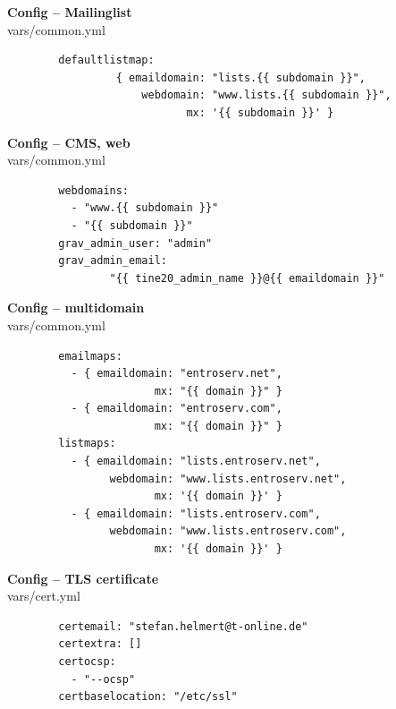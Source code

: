 \documentclass{beamer}
\begin{document}
\begin{frame}[fragile]{\insertsection}{\insertsubsection}
	\vspace{-0.5cm}
	\textbf{Config -- Mailinglist}\\
	vars/common.yml
	\begin{verbatim}
		defaultlistmap:
		         { emaildomain: "lists.{{ subdomain }}",
		             webdomain: "www.lists.{{ subdomain }}",
		                    mx: '{{ subdomain }}' }
	\end{verbatim}
\end{frame}	

\begin{frame}[fragile]{\insertsection}{\insertsubsection}
	\vspace{-0.5cm}
	\textbf{Config -- CMS, web}\\
	vars/common.yml
	\begin{verbatim}
		webdomains: 
		  - "www.{{ subdomain }}"
		  - "{{ subdomain }}"
		grav_admin_user: "admin"
		grav_admin_email:
		        "{{ tine20_admin_name }}@{{ emaildomain }}"
	\end{verbatim}
\end{frame}	

\begin{frame}[fragile]{\insertsection}{\insertsubsection}
	\vspace{-0.5cm}
	\textbf{Config -- multidomain}\\
	vars/common.yml
	\begin{verbatim}
		emailmaps:
		  - { emaildomain: "entroserv.net",
		               mx: "{{ domain }}" }
		  - { emaildomain: "entroserv.com",
		               mx: "{{ domain }}" }
		listmaps:
		  - { emaildomain: "lists.entroserv.net",
		        webdomain: "www.lists.entroserv.net",
		               mx: '{{ domain }}' }
		  - { emaildomain: "lists.entroserv.com",
		        webdomain: "www.lists.entroserv.com",
		               mx: '{{ domain }}' }
	\end{verbatim}
\end{frame}	

\begin{frame}[fragile]{\insertsection}{\insertsubsection}
	\vspace{-0.5cm}
	\textbf{Config -- TLS certificate}\\
	vars/cert.yml
	\begin{verbatim}
		certemail: "stefan.helmert@t-online.de"
		certextra: []
		certocsp:
		  - "--ocsp"
		certbaselocation: "/etc/ssl"
	\end{verbatim}
\end{frame}	
\end{document}

